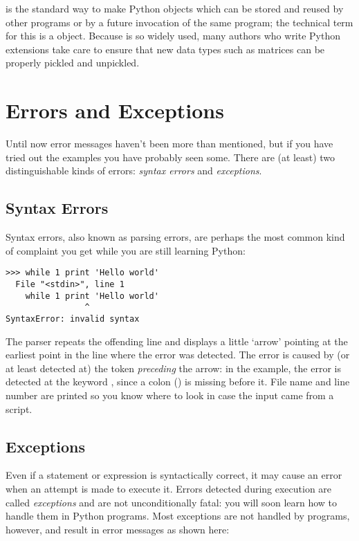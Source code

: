 \documentclass{manual}
\begin{document}
 is the standard way to make Python objects which can be
stored and reused by other programs or by a future invocation of the
same program; the technical term for this is a 
object.  Because  is so widely used, many authors who
write Python extensions take care to ensure that new data types such
as matrices can be properly pickled and unpickled.



\chapter{Errors and Exceptions \label{errors}}

Until now error messages haven't been more than mentioned, but if you
have tried out the examples you have probably seen some.  There are
(at least) two distinguishable kinds of errors: \emph{syntax errors}
and \emph{exceptions}.

\section{Syntax Errors \label{syntaxErrors}}

Syntax errors, also known as parsing errors, are perhaps the most common
kind of complaint you get while you are still learning Python:

\begin{verbatim}
>>> while 1 print 'Hello world'
  File "<stdin>", line 1
    while 1 print 'Hello world'
                ^
SyntaxError: invalid syntax
\end{verbatim}

The parser repeats the offending line and displays a little `arrow'
pointing at the earliest point in the line where the error was detected.
The error is caused by (or at least detected at) the token
\emph{preceding}
the arrow: in the example, the error is detected at the keyword
, since a colon (\character{:}) is missing before it.
File name and line number are printed so you know where to look in case
the input came from a script.

\section{Exceptions \label{exceptions}}

Even if a statement or expression is syntactically correct, it may
cause an error when an attempt is made to execute it.
Errors detected during execution are called \emph{exceptions} and are
not unconditionally fatal: you will soon learn how to handle them in
Python programs.  Most exceptions are not handled by programs,
however, and result in error messages as shown here:
\end{document}
